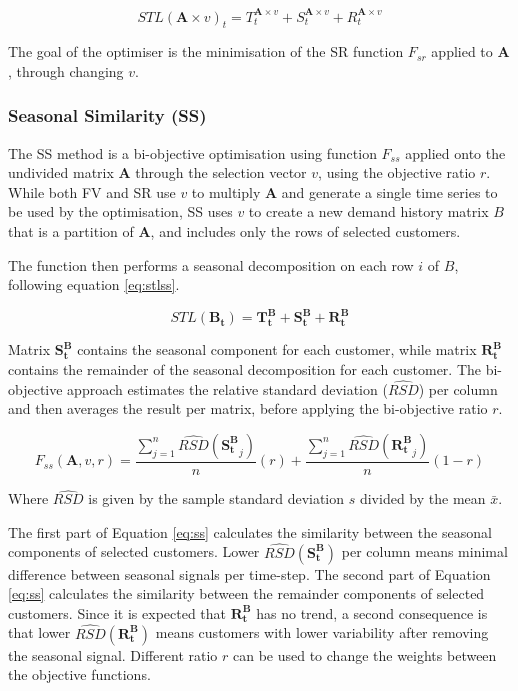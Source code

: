 \documentclass[review, 3p, 12pt, authoryear]{elsarticle}
\begin{document}
\begin{equation}
   STL (\bm{A} \times v)_t = T^{\bm{A} \times v}_t + S^{\bm{A} \times v}_t + R^{\bm{A} \times v}_t
   \label{eq:stlsr}
\end{equation}

The goal of the optimiser is the minimisation of the SR function $F_{sr}$ applied to $\bm{A}$, through changing $v$.

\subsubsection{Seasonal Similarity (SS)}
\label{sss:SS}
The SS method is a bi-objective optimisation using function $F_{ss}$ applied onto the undivided matrix $\bm{A}$ through the selection vector $v$, using the objective ratio $r$.
While both FV and SR use $v$ to multiply $\bm{A}$ and generate a single time series to be used by the optimisation, SS uses $v$ to create a new demand history matrix $B$ that is a partition of $\bm{A}$, and includes only the rows of selected customers.

The function then performs a seasonal decomposition on each row $i$ of $B$, following equation \ref{eq:stlss}.

\begin{equation}
   STL (\bm{B_t}) = \bm{T^B_t} + \bm{S^B_t} + \bm{R^B_t}
   \label{eq:stlss}
\end{equation}

Matrix $\bm{S^B_t}$ contains the seasonal component for each customer, while matrix $\bm{R^B_t}$ contains the remainder of the seasonal decomposition for each customer.
The bi-objective approach estimates the relative standard deviation ($\widehat{RSD}$) per column and then averages the result per matrix, before applying the bi-objective ratio $r$.

\begin{equation}
   F_{ss}(\bm{A},v,r) = \frac{\sum_{j=1}^{n}\widehat{RSD}({\bm{S^B_t}}_j)}{n} (r) + \frac{\sum_{j=1}^{n}\widehat{RSD}({\bm{R^B_t}}_j)}{n} (1-r)
   \label{eq:ss}
\end{equation}

Where $\widehat{RSD}$ is given by the sample standard deviation $s$ divided by the mean $\bar{x}$.

The first part of Equation \ref{eq:ss} calculates the similarity between the seasonal components of selected customers. Lower $\widehat{RSD}(\bm{S^B_t})$ per column means minimal difference between seasonal signals per time-step. The second part of Equation \ref{eq:ss} calculates the similarity between the remainder components of selected customers. Since it is expected that $\bm{R^B_t}$ has no trend, a second consequence is that lower $\widehat{RSD}(\bm{R^B_t})$ means customers with lower variability after removing the seasonal signal. Different ratio $r$ can be used to change the weights between the objective functions.
\end{document}
